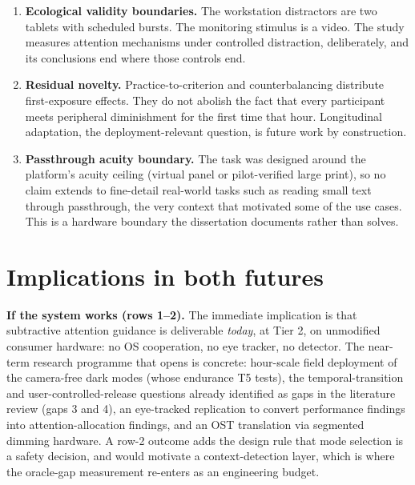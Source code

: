 \begin{enumerate}
   frozen OS/SDK versions, on a platform whose capabilities have already moved once mid-project.
\item \textbf{Ecological validity boundaries.} The workstation distractors are two tablets with scheduled
   bursts. The monitoring stimulus is a video. The study measures attention mechanisms under
   controlled distraction, deliberately, and its conclusions end where those controls end.
\item \textbf{Residual novelty.} Practice-to-criterion and counterbalancing distribute first-exposure
   effects. They do not abolish the fact that every participant meets peripheral diminishment for
   the first time that hour. Longitudinal adaptation, the deployment-relevant question, is future
   work by construction.
\item \textbf{Passthrough acuity boundary.} The task was designed around the platform's acuity ceiling
   (virtual panel or pilot-verified large print), so no claim extends to fine-detail real-world
   tasks such as reading small text through passthrough, the very context that motivated some of
   the use cases. This is a hardware boundary the dissertation documents rather than solves.
\end{enumerate}

\section{Implications in both futures}

\textbf{If the system works (rows 1–2).} The immediate implication is that subtractive attention
guidance is deliverable \textit{today}, at Tier 2, on unmodified consumer hardware: no OS cooperation, no
eye tracker, no detector. The near-term research programme that opens is concrete: hour-scale field
deployment of the camera-free dark modes (whose endurance T5 tests), the temporal-transition
and user-controlled-release questions already identified as gaps in the literature review (gaps 3
and 4), an eye-tracked replication to convert performance findings into attention-allocation
findings, and an OST translation via segmented dimming hardware. A row-2 outcome adds the design
rule that mode selection is a safety decision, and would motivate a context-detection layer,
which is where the oracle-gap measurement re-enters as an engineering budget.

